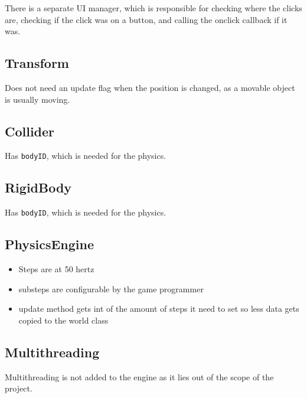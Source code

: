 \documentclass{article}
\begin{document}
\noindent
There is a separate UI manager, which is responsible for checking where the clicks are, checking if the click was on a button, and calling the onclick callback if it was.

\subsection{Transform}
Does not need an update flag when the position is changed, as a movable object is usually moving.

\subsection{Collider}
Has \texttt{bodyID}, which is needed for the physics.

\subsection{RigidBody}
Has \texttt{bodyID}, which is needed for the physics.

\subsection{PhysicsEngine}{
  \begin{itemize}
    \item Steps are at 50 hertz
    \item substeps are configurable by the game programmer
    \item update method gets int of the amount of steps it need to set so less data gets copied to the world class
  \end{itemize}
}

\subsection{Multithreading}
Multithreading is not added to the engine as it lies out of the scope of the project.
\end{document}
